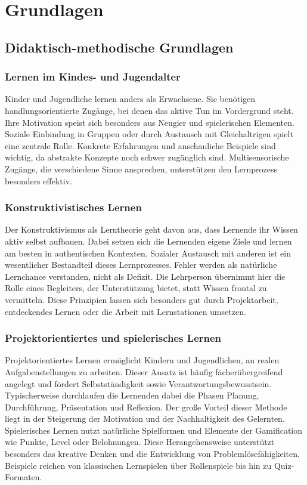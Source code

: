 \chapter{Grundlagen}
\label{sec:Grundlagen}
\section{Didaktisch-methodische Grundlagen}

\subsection{Lernen im Kindes- und Jugendalter }
\label{sec:Lernen im Kindes- und Jugendalter}
Kinder und Jugendliche lernen anders als Erwachsene. Sie benötigen handlungsorientierte Zugänge, bei denen das aktive Tun im Vordergrund steht. Ihre Motivation speist sich besonders aus Neugier und spielerischen Elementen. Soziale Einbindung in Gruppen oder durch Austausch mit Gleichaltrigen spielt eine zentrale Rolle. Konkrete Erfahrungen und anschauliche Beispiele sind wichtig, da abstrakte Konzepte noch schwer zugänglich sind. Multisensorische Zugänge, die verschiedene Sinne ansprechen, unterstützen den Lernprozess besonders effektiv.

\subsection{Konstruktivistisches Lernen}
\label{sec:Konstruktivistisches Lernen}
Der Konstruktivismus als Lerntheorie geht davon aus, dass Lernende ihr Wissen aktiv selbst aufbauen. Dabei setzen sich die Lernenden eigene Ziele und lernen am besten in authentischen Kontexten. Sozialer Austausch mit anderen ist ein wesentlicher Bestandteil dieses Lernprozesses. Fehler werden als natürliche Lernchance verstanden, nicht als Defizit. Die Lehrperson übernimmt hier die Rolle eines Begleiters, der Unterstützung bietet, statt Wissen frontal zu vermitteln. Diese Prinzipien lassen sich besonders gut durch Projektarbeit, entdeckendes Lernen oder die Arbeit mit Lernstationen umsetzen.
\subsection{Projektorientiertes und spielerisches Lernen}
\label{sec:Projektorientiertes und spielerisches Lernen}
Projektorientiertes Lernen ermöglicht Kindern und Jugendlichen, an realen Aufgabenstellungen zu arbeiten. Dieser Ansatz ist häufig fächerübergreifend angelegt und fördert Selbstständigkeit sowie Verantwortungsbewusstsein. Typischerweise durchlaufen die Lernenden dabei die Phasen Planung, Durchführung, Präsentation und Reflexion. Der große Vorteil dieser Methode liegt in der Steigerung der Motivation und der Nachhaltigkeit des Gelernten. Spielerisches Lernen nutzt natürliche Spielformen und Elemente der Gamification wie Punkte, Level oder Belohnungen. Diese Herangehensweise unterstützt besonders das kreative Denken und die Entwicklung von Problemlösefähigkeiten. Beispiele reichen von klassischen Lernspielen über Rollenspiele bis hin zu Quiz-Formaten.



